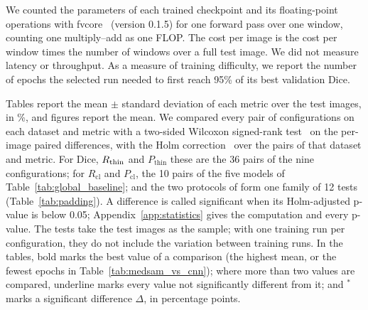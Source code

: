 

We counted the parameters of each trained checkpoint and its floating-point operations with fvcore~\cite{fvcore2022} (version 0.1.5) for one forward pass over one window, counting one multiply--add as one FLOP. The cost per image is the cost per window times the number of windows over a full test image. We did not measure latency or throughput. As a measure of training difficulty, we report the number of epochs the selected run needed to first reach 95\% of its best validation Dice.

Tables report the mean $\pm$ standard deviation of each metric over the test images, in \%, and figures report the mean. We compared every pair of configurations on each dataset and metric with a two-sided Wilcoxon signed-rank test~\cite{wilcoxon1945individual} on the per-image paired differences, with the Holm correction~\cite{holm1979simple} over the pairs of that dataset and metric. For Dice, $R_{\mathrm{thin}}$ and $P_{\mathrm{thin}}$ these are the 36 pairs of the nine configurations; for $R_{\mathrm{cl}}$ and $P_{\mathrm{cl}}$, the 10 pairs of the five models of Table~\ref{tab:global_baseline}; and the two protocols of \medsam{} form one family of 12 tests (Table~\ref{tab:padding}). A difference is called significant when its Holm-adjusted p-value is below 0.05; Appendix~\ref{app:statistics} gives the computation and every p-value. The tests take the test images as the sample; with one training run per configuration, they do not include the variation between training runs. In the tables, bold marks the best value of a comparison (the highest mean, or the fewest epochs in Table~\ref{tab:medsam_vs_cnn}); where more than two values are compared, underline marks every value not significantly different from it; and $^{*}$ marks a significant difference $\Delta$, in percentage points.
